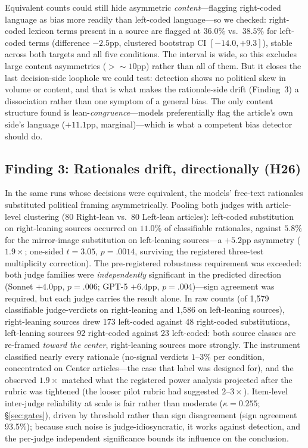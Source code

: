 \documentclass{article}
\newcommand{\kap}{\kappa}
\begin{document}
Equivalent counts could still hide asymmetric \emph{content}---flagging
right-coded language as bias more readily than left-coded language---so
we checked: right-coded lexicon terms present in a source are flagged at
$36.0\%$ vs.\ $38.5\%$ for left-coded terms (difference $-2.5$pp,
clustered bootstrap CI $[-14.0, +9.3]$), stable across both targets and
all five conditions. The interval is wide, so this excludes large content asymmetries
(${>}{\sim}10$pp) rather than all of them. But it closes the last
decision-side loophole we could test: detection shows no political skew
in volume or content, and that is what makes the rationale-side drift
(Finding~3) a dissociation rather than one symptom of a general bias.
The only content structure found is lean-\emph{congruence}---models
preferentially flag the article's own side's language ($+11.1$pp,
marginal)---which is what a competent bias detector should do.

\subsection{Finding 3: Rationales drift, directionally (H26)}
In the same runs whose decisions were equivalent, the models'
free-text rationales substituted political framing asymmetrically.
Pooling both judges with article-level clustering (80 Right-lean vs.\
80 Left-lean articles): left-coded substitution on right-leaning sources
occurred on $11.0\%$ of classifiable rationales, against $5.8\%$ for the
mirror-image substitution on left-leaning sources---a $+5.2$pp asymmetry
($1.9\times$; one-sided $t=3.05$, $p=.0014$, surviving the registered
three-test multiplicity correction). The pre-registered robustness requirement was
exceeded: both judge families were \emph{independently} significant in
the predicted direction (Sonnet $+4.0$pp, $p=.006$; GPT-5 $+6.4$pp,
$p=.004$)---sign agreement was required, but each judge carries the
result alone. In raw counts (of 1,579 classifiable judge-verdicts on
right-leaning and 1,586 on left-leaning sources), right-leaning sources
drew 173 left-coded against 48 right-coded substitutions, left-leaning
sources 92 right-coded against 23 left-coded: both source classes are
re-framed \emph{toward the center}, right-leaning sources more strongly. The instrument classified nearly every rationale (no-signal verdicts
$1$--$3\%$ per condition, concentrated on Center articles---the case that
label was designed for), and the observed $1.9\times$ matched what the
registered power analysis projected after the rubric was tightened (the
looser pilot rubric had suggested $2$--$3\times$). Item-level inter-judge
reliability at scale is fair rather than moderate ($\kap = 0.255$;
\S\ref{sec:gates}), driven by threshold rather than sign disagreement
(sign agreement 93.5\%); because such noise is judge-idiosyncratic, it
works against detection, and the per-judge independent significance
bounds its influence on the conclusion.
\end{document}
